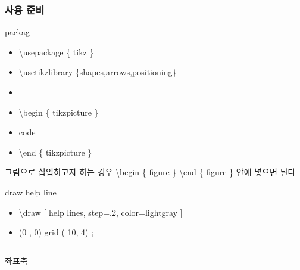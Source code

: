 \documentclass[ aspectratio=169,  12pt,blue,xcolor=pdftex,dvipsnames,table,handout,notes]{beamer}
\begin{document}
		\begin{frame}[c,allowframebreaks]
		\frametitle{사용 준비}

			\begin{block}{packag}
			\begin{itemize}
			\item[] 	\textbackslash usepackage \{ tikz \}
			\item[] 	\textbackslash usetikzlibrary \{shapes,arrows,positioning\}
			\item[] 	
			\item[] 	\textbackslash begin \{ tikzpicture \}
			\item[] 	\hskip 10mm code
			\item[] 	\textbackslash end \{ tikzpicture \}
			\end{itemize}
			\end{block}


			그림으로 삽입하고자 하는 경우 \textbackslash begin \{ figure \}  \textbackslash end \{ figure \} 안에 넣으면 된다

			\begin{block}{draw help line}
			\begin{itemize}
			\item[] 	\textbackslash draw [ help lines, step=.2, color=lightgray ]
			\item[] 	(0 , 0) grid ( 10, 4) ;
			\end{itemize}
			\end{block}


		\begin{columns}
		\begin{column}{0.4\textwidth}
			\begin{block}{좌표축}
			\end{block}




		\end{column}
		\end{columns}

		\end{frame}
\end{document}
